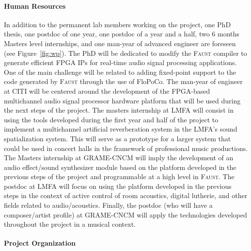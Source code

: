 \documentclass[a4paper,10pt]{article}
\newcommand{\F}{\textsc{Faust}}
\begin{document}
\paragraph{Human Resources}

In addition to the permanent lab members working on the project, one PhD thesis, one postdoc of one year, one postdoc of a year and a half, two 6 months Masters level internships, and one man-year of advanced engineer are foreseen (see Figure~\ref{fig:wp}). The PhD will be dedicated to modify the \F{} compiler to generate efficient FPGA IPs for real-time audio signal processing applications. One of the main challenge will be related to adding fixed-point support to the code generated by \F{} through the use of FloPoCo. The man-year of engineer at CITI will be centered around the development of the FPGA-based multichannel audio signal processor hardware platform that will be used during the next steps of the project. The masters internship at LMFA will consist in using the tools developed during the first year and half of the project to implement a multichannel artificial reverberation system in the LMFA's sound spatialization system. This will serve as a prototype for a larger system that could be used in concert halls in the framework of professional music productions. The Masters internship at GRAME-CNCM will imply the development of an audio effect/sound synthesizer module based on the platform developed in the previous steps of the project and programmable at a high level in \F{}. The postdoc at LMFA will focus on using the platform developed in the previous steps in the context of active control of room acoustics, digital lutherie, and other fields related to audio/acoustics. Finally, the postdoc (who will have a composer/artist profile) at GRAME-CNCM will apply the technologies developed throughout the project in a musical context.

\paragraph{Project Organization}
\end{document}
